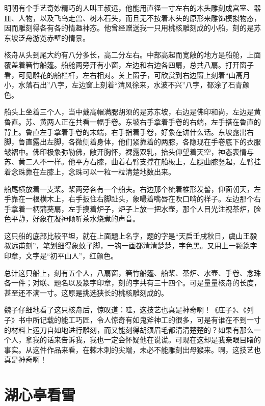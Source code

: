 \documentclass[12pt,UTF-8,openany,a4]{ctexbook}
\begin{document}
\begin{large}\yiwen
    
    明朝有个手艺奇妙精巧的人叫王叔远，他能用直径一寸左右的木头雕刻成宫室、器皿、人物，以及飞鸟走兽、树木石头，而且无不按着木头的原形来雕饰模拟物态，因而雕刻得各有各的情趣神态。他曾经赠送我一只用桃核雕刻成的小船，刻的是苏东坡泛舟游览赤壁的情景。
    
    核舟从头到尾大约有八分多长，高二分左右。中部高起而宽敞的地方是船舱，上面覆盖着箬竹船篷。船舱两旁开有小窗，左边和右边各四扇，总共八扇。打开窗子看，可见雕花的船栏杆，左右相对。关上窗子，可欣赏到右边窗上刻着“山高月小，水落石出”八字，左边窗上刻着“清风徐来，水波不兴”八字，都涂了石青颜色。
    
    船头上坐着三个人，当中戴高帽满腮胡须的是苏东坡，右边是佛印和尚，左边是黄鲁直。苏、黄两人正在共看一幅手卷。东坡右手拿着手卷的右端，左手搭在鲁直的背上。鲁直左手拿着手卷的末端，右手指着手卷，好象在讲什么话。东坡露出右脚，鲁直露出左脚，各微侧着身体，他们紧靠着的两膝，各隐现在手卷底下的衣服皱褶中。佛印极象弥勒佛，敞开胸怀，裸露双乳，抬头仰望着天空，神态表情与苏、黄二人不一样。他平方右膝，曲着右臂支撑在船板上，左腿曲膝竖起，左臂挂着念珠靠在左膝上，念珠可以一粒一粒清楚地数出来。
    
    船尾横放着一支桨。桨两旁各有一个船夫。右边那个梳着椎形发髻，仰面朝天，左手靠在一根横木上，右手扳住右脚趾头，象嘬着嘴唇在吹口哨的样子。左边那个右手拿着一柄蒲葵扇，左手摸着炉子，炉子上放一把水壶，那个人目光注视茶炉，脸色平静，好象在凝神倾听茶水烧煮的声音。
    
    这只船的底部比较平坦，就在上面题上名字，题的字是“天启壬戌秋日，虞山王毅叔远甫刻”，笔划细得象蚊子脚，一钩一画都清清楚楚，字色黑。又用上一颗篆字印章，文字是“初平山人”，红颜色。
    
    总计这只船上，刻有五个人，八扇窗，箬竹船篷、船桨、茶炉、水壶、手卷、念珠各一件；对联、题名以及篆字印章，刻的字共有三十四个。可是量量核舟的长度，甚至还不满一寸。这原是挑选狭长的桃核雕刻成的。
    
    魏子仔细地看了这只核舟后，惊叹道：哇，这技艺也真是神奇啊！《庄子》、《列子》书中所记载的能工巧匠，令人惊奇有如鬼斧神工的很多，可是有谁在不到一寸的材料上运刀自如地进行雕刻，而又能刻得胡须眉毛都清清楚楚的？如果有那么一个人，拿我的话来告诉我，我也一定会怀疑他在说谎。可现在这却是我亲眼目睹的事实。从这件作品来看，在棘木刺的尖端，未必不能雕刻出母猴来。啊，这技艺也真是神奇啊！
    

\end{large}



\chapter{湖心亭看雪}
\end{document}
